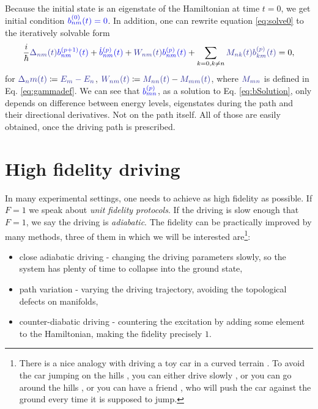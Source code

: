 Because the initial state is an eigenstate of the Hamiltonian at time $t=0$, we get initial condition $\blue{b_{nm}^{(0)}(t)=0}$. In addition, one can rewrite equation \ref{eq:solve0} to the iteratively solvable form
\begin{equation}
    \frac{i}{\hbar}\bluee{\Delta_{nm}(t)}\blue{b_{nm}^{(p+1)}(t)}+\blue{\dot b_{nm}^{(p)}(t)}+\bluee{W_{nm}(t)} \blue{b_{nm}^{(p)}(t)}+\sum_{k=0,k\neq n}\bluee{M_{nk}(t)}\bluee{b_{km}^{(p)}(t)}=0,
    \label{eq:bSolution}
\end{equation}
for $\bluee{\Delta_nm(t)}\coloneqq \bluee{E_m-E_n}$, $\bluee{W_{nm}(t)}\coloneqq \bluee{M_{nn}(t)}-\bluee{M_{mm}(t)}$, where $\bluee{M_{mn}}$ is defined in Eq. \ref{eq:gammadef}. We can see that $\blue{b_{mn}^{(p)}}$, as a solution to Eq. \ref{eq:bSolution}, only depends on difference between energy levels, eigenstates during the path and their directional derivatives. Not on the path itself. All of those are easily obtained, once the driving path is prescribed.










\section{High fidelity driving}
\label{chap:typesOfDriving}
In many experimental settings, one needs to achieve as high fidelity as possible. If $F=1$ we speak about \emph{unit fidelity protocols}. If the driving is slow enough that $F=1$, we say the driving is \emph{adiabatic}. The fidelity can be practically improved by many methods, three of them in which we will be interested are\footnote{There is a nice analogy with driving a toy car  in a curved terrain . To avoid the car jumping on the hills , you can either drive slowly , or you can go around the hills , or you can have a friend , who will push the car against the ground every time it is supposed to jump.}:
\begin{itemize}
    \item close adiabatic driving - changing the driving parameters slowly, so the system has plenty of time to collapse into the ground state,
    \item path variation - varying the driving trajectory, avoiding the topological defects on manifolds,
    \item counter-diabatic driving - countering the excitation by adding some element to the Hamiltonian, making the fidelity precisely $1$.
\end{itemize}



